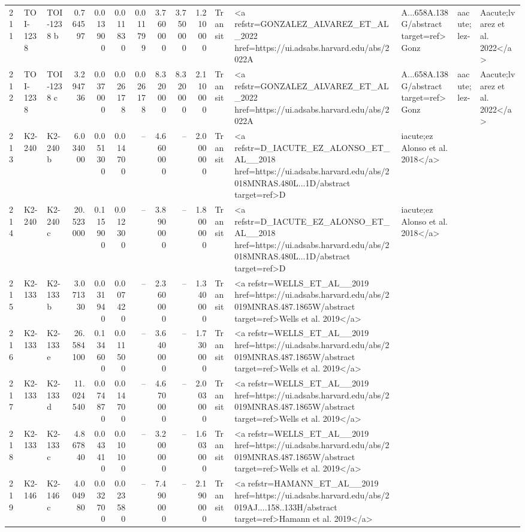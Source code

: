 \begin{tabular}{lllrrrrrrrll}
211 & TOI-1238 & TOI-1238 b & 0.764597 & 0.013900 & 0.011830 & 0.011799 & 3.760000 & 3.750000 & 1.210000 & Transit & <a refstr=GONZALEZ_ALVAREZ_ET_AL_2022 href=https://ui.adsabs.harvard.edu/abs/2022A&A...658A.138G/abstract target=ref>Gonz&aacute;lez-&Aacute;lvarez et al. 2022</a> \\
212 & TOI-1238 & TOI-1238 c & 3.294736 & 0.037000 & 0.026178 & 0.026178 & 8.320000 & 8.320000 & 2.110000 & Transit & <a refstr=GONZALEZ_ALVAREZ_ET_AL_2022 href=https://ui.adsabs.harvard.edu/abs/2022A&A...658A.138G/abstract target=ref>Gonz&aacute;lez-&Aacute;lvarez et al. 2022</a> \\
213 & K2-240 & K2-240 b & 6.034000 & 0.051300 & 0.014700 & -- & 4.660000 & -- & 2.000000 & Transit & <a refstr=D_IACUTE_EZ_ALONSO_ET_AL__2018 href=https://ui.adsabs.harvard.edu/abs/2018MNRAS.480L...1D/abstract target=ref>D&iacute;ez Alonso et al. 2018</a> \\
214 & K2-240 & K2-240 c & 20.523000 & 0.115900 & 0.012300 & -- & 3.890000 & -- & 1.800000 & Transit & <a refstr=D_IACUTE_EZ_ALONSO_ET_AL__2018 href=https://ui.adsabs.harvard.edu/abs/2018MNRAS.480L...1D/abstract target=ref>D&iacute;ez Alonso et al. 2018</a> \\
215 & K2-133 & K2-133 b & 3.071330 & 0.031940 & 0.007420 & -- & 2.360000 & -- & 1.340000 & Transit & <a refstr=WELLS_ET_AL__2019 href=https://ui.adsabs.harvard.edu/abs/2019MNRAS.487.1865W/abstract target=ref>Wells et al. 2019</a> \\
216 & K2-133 & K2-133 e & 26.584100 & 0.134600 & 0.011500 & -- & 3.640000 & -- & 1.730000 & Transit & <a refstr=WELLS_ET_AL__2019 href=https://ui.adsabs.harvard.edu/abs/2019MNRAS.487.1865W/abstract target=ref>Wells et al. 2019</a> \\
217 & K2-133 & K2-133 d & 11.024540 & 0.074870 & 0.014700 & -- & 4.670000 & -- & 2.003000 & Transit & <a refstr=WELLS_ET_AL__2019 href=https://ui.adsabs.harvard.edu/abs/2019MNRAS.487.1865W/abstract target=ref>Wells et al. 2019</a> \\
218 & K2-133 & K2-133 c & 4.867840 & 0.043410 & 0.010100 & -- & 3.200000 & -- & 1.603000 & Transit & <a refstr=WELLS_ET_AL__2019 href=https://ui.adsabs.harvard.edu/abs/2019MNRAS.487.1865W/abstract target=ref>Wells et al. 2019</a> \\
219 & K2-146 & K2-146 c & 4.004980 & 0.032700 & 0.023580 & -- & 7.490000 & -- & 2.190000 & Transit & <a refstr=HAMANN_ET_AL__2019 href=https://ui.adsabs.harvard.edu/abs/2019AJ....158..133H/abstract target=ref>Hamann et al. 2019</a> \\

\end{tabular}
